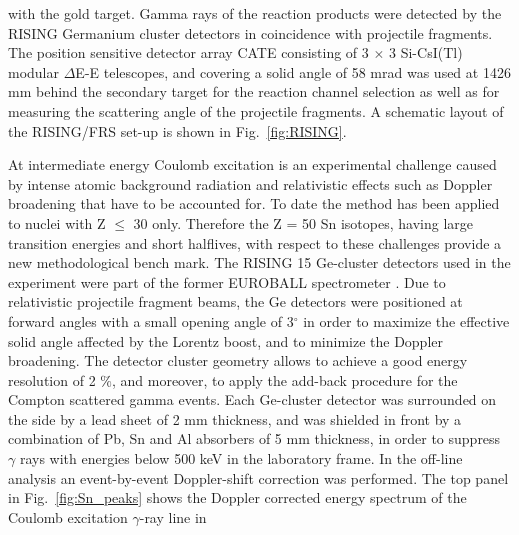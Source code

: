 \documentclass[aps,prc,twocolumn,amssymb,showpacs]{revtex4}
\begin{document}
with the gold target. Gamma rays of the reaction products were
detected by the RISING Germanium cluster detectors in coincidence
with projectile fragments. The position sensitive detector array
CATE \cite{loz05} consisting of 3 $\times$ 3 Si-CsI(Tl) modular
$\Delta$E-E telescopes, and covering a solid angle of 58 mrad was
used at 1426 mm behind the secondary target for the reaction
channel selection as well as for measuring the scattering angle of
the projectile fragments. A schematic layout of the RISING/FRS
set-up is shown in Fig.~\ref{fig:RISING}.\\
\begin{figure*}[ht]
\centering\mbox{}
\caption{\small Schematic layout of the RISING/FRS set-up. The
beam spectrometer consists of two multiwire proportional chambers
(MW1, MW2), an ionization chamber (MUSIC), and two plastic
scintillation detectors (SCI1, SCI2). The $\gamma$ rays are
measured with an array of Ge-Cluster detectors. The fragments
scattered off the Coulex target are identified by the calorimeter
telescope CATE.} \label{fig:RISING}
\end{figure*}
At intermediate energy Coulomb excitation is an experimental
challenge caused by intense atomic background radiation and
relativistic effects such as Doppler broadening that have to be
accounted for. To date the method has been applied to nuclei with
Z $\leq$ 30 only. Therefore the Z = 50 Sn isotopes, having large
transition energies and short halflives, with respect to these
challenges provide a new methodological bench mark. The RISING 15
Ge-cluster detectors used in the experiment were part of the
former EUROBALL spectrometer \cite{sim97}. Due to relativistic
projectile fragment beams, the Ge detectors were positioned at
forward angles with a small opening angle of 3$^{\circ}$ in order
to maximize the effective solid angle affected by the Lorentz
boost, and to minimize the Doppler broadening. The detector
cluster geometry allows to achieve a good energy resolution of 2
$\%$, and moreover, to apply the add-back procedure for the
Compton scattered gamma events. Each Ge-cluster detector was
surrounded on the side by a lead sheet of 2 mm thickness, and was
shielded in front by a combination of Pb, Sn and Al absorbers of 5
mm thickness, in order to suppress $\gamma$ rays with energies
below 500 keV in the laboratory frame. In the off-line analysis an
event-by-event Doppler-shift correction was performed. The top
panel in Fig.~\ref{fig:Sn_peaks} shows the Doppler corrected
energy spectrum of the Coulomb excitation $\gamma$-ray line in
\end{document}
